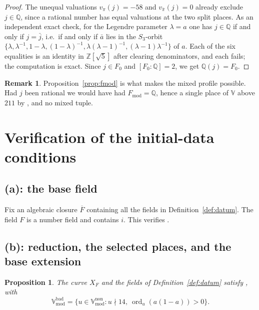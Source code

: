 \documentclass[11pt]{article}
\theoremstyle{plain}
\newtheorem{proposition}[theorem]{Proposition}
\theoremstyle{definition}
\newtheorem{remark}[theorem]{Remark}
\newcommand{\Fmod}{F_{\mathrm{mod}}}
\newcommand{\Vmod}{\mathbb{V}_{\mathrm{mod}}}
\newcommand{\Vbad}{\mathbb{V}^{\mathrm{bad}}}
\newcommand{\VV}{\mathbb{V}}
\newcommand{\ord}{\operatorname{ord}}
\begin{document}
\begin{proof}
The unequal valuations $v_\pi(j)=-58$ and $v_{\bar\pi}(j)=0$ already exclude
$j\in\mathbb Q$, since a rational number has equal valuations at the two split
places.  As an independent exact check, for the Legendre parameter $\lambda=a$
one has $j\in\mathbb{Q}$ if and only if
$j=\bar j$, i.e.\ if and only if $\bar a$ lies in the $S_3$-orbit
$\{\lambda,\lambda^{-1},1-\lambda,(1-\lambda)^{-1},\lambda(\lambda-1)^{-1},
(\lambda-1)\lambda^{-1}\}$ of $a$.  Each of the six equalities is an identity in
$\mathbb{Z}[\sqrt5]$ after clearing denominators, and each fails; the
computation is exact.  Since $j\in F_0$ and $[F_0{:}\mathbb{Q}]=2$, we get
$\mathbb{Q}(j)=F_0$.
\end{proof}

\begin{remark}
Proposition~\ref{prop:fmod} is what makes the mixed profile possible.  Had $j$
been rational we would have had $\Fmod=\mathbb{Q}$, hence a single place of
$\VV$ above $211$ by \cite[Definition 3.1(e)]{IUT1}, and no mixed tuple.
\end{remark}

\section{Verification of the initial-data conditions}
\label{sec:def31}

\subsection{(a): the base field}
Fix an algebraic closure $\overline F$ containing all the fields in
Definition~\ref{def:datum}. The field $F$ is a number field and contains $i$.
This verifies \cite[Definition 3.1(a)]{IUT1}.

\subsection{(b): reduction, the selected places, and the base extension}

\begin{proposition}\label{prop:b}
The curve $X_F$ and the fields of Definition~\ref{def:datum} satisfy
\cite[Definition 3.1(b)]{IUT1}, with
\[
 \Vbad_{\mathrm{mod}}
 =\{u\in\Vmod^{\mathrm{non}}:u\nmid14,\ \ord_u(a(1-a))>0\}.
\]
\end{proposition}
\end{document}
